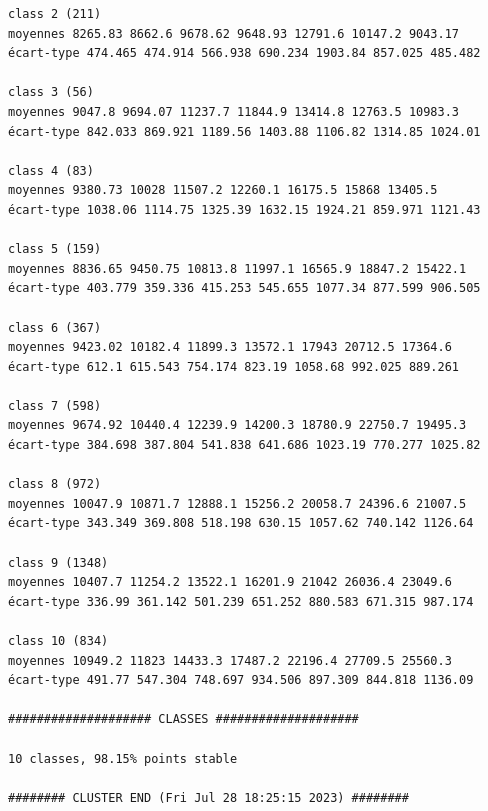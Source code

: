 \documentclass[land,article,submit,pdftex,moreauthors]{Definitions/mdpi}
\begin{document}
\begin{scriptsize}
\begin{verbatim}
class 2 (211)
moyennes 8265.83 8662.6 9678.62 9648.93 12791.6 10147.2 9043.17
écart-type 474.465 474.914 566.938 690.234 1903.84 857.025 485.482

class 3 (56)
moyennes 9047.8 9694.07 11237.7 11844.9 13414.8 12763.5 10983.3
écart-type 842.033 869.921 1189.56 1403.88 1106.82 1314.85 1024.01

class 4 (83)
moyennes 9380.73 10028 11507.2 12260.1 16175.5 15868 13405.5
écart-type 1038.06 1114.75 1325.39 1632.15 1924.21 859.971 1121.43

class 5 (159)
moyennes 8836.65 9450.75 10813.8 11997.1 16565.9 18847.2 15422.1
écart-type 403.779 359.336 415.253 545.655 1077.34 877.599 906.505

class 6 (367)
moyennes 9423.02 10182.4 11899.3 13572.1 17943 20712.5 17364.6
écart-type 612.1 615.543 754.174 823.19 1058.68 992.025 889.261

class 7 (598)
moyennes 9674.92 10440.4 12239.9 14200.3 18780.9 22750.7 19495.3
écart-type 384.698 387.804 541.838 641.686 1023.19 770.277 1025.82

class 8 (972)
moyennes 10047.9 10871.7 12888.1 15256.2 20058.7 24396.6 21007.5
écart-type 343.349 369.808 518.198 630.15 1057.62 740.142 1126.64

class 9 (1348)
moyennes 10407.7 11254.2 13522.1 16201.9 21042 26036.4 23049.6
écart-type 336.99 361.142 501.239 651.252 880.583 671.315 987.174

class 10 (834)
moyennes 10949.2 11823 14433.3 17487.2 22196.4 27709.5 25560.3
écart-type 491.77 547.304 748.697 934.506 897.309 844.818 1136.09

#################### CLASSES ####################

10 classes, 98.15% points stable

######## CLUSTER END (Fri Jul 28 18:25:15 2023) ########

\end{verbatim}
\end{scriptsize}
\end{document}

